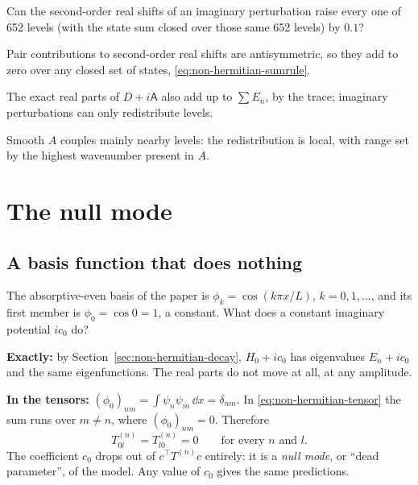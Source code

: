 \begin{checkpoint}
Can the second-order real shifts of an imaginary perturbation raise every one of 652 levels (with the state sum closed over those same 652 levels) by $0.1$?
\end{checkpoint}

\begin{keyideas}
\item Pair contributions to second-order real shifts are antisymmetric, so they add to zero over any closed set of states, \eqref{eq:non-hermitian-sumrule}.
\item The exact real parts of $D+i\mathsf A$ also add up to $\sum E_n$, by the trace; imaginary perturbations can only redistribute levels.
\item Smooth $A$ couples mainly nearby levels: the redistribution is local, with range set by the highest wavenumber present in $A$.
\end{keyideas}

\section{The null mode}\label{sec:non-hermitian-null}

\subsection{A basis function that does nothing}

The absorptive-even basis of the paper is $\phi_k=\cos(k\pi x/L)$, $k=0,1,\dots$, and its first member is $\phi_0=\cos0=1$, a constant. What does a constant imaginary potential $ic_0$ do?

\textbf{Exactly:} by Section~\ref{sec:non-hermitian-decay}, $H_0+ic_0$ has eigenvalues $E_n+ic_0$ and the same eigenfunctions. The real parts do not move at all, at any amplitude.

\textbf{In the tensors:} $(\phi_0)_{nm}=\int\psi_n\psi_m\,\dd x=\delta_{nm}$. In \eqref{eq:non-hermitian-tensor} the sum runs over $m\ne n$, where $(\phi_0)_{nm}=0$. Therefore
\begin{equation}
T^{(n)}_{0l}=T^{(n)}_{l0}=0\qquad\text{for every } n \text{ and } l .
\label{eq:non-hermitian-nullrows}
\end{equation}
The coefficient $c_0$ drops out of $c^\top T^{(n)}c$ entirely: it is a \emph{null mode}, or ``dead parameter'', of the model. Any value of $c_0$ gives the same predictions.

